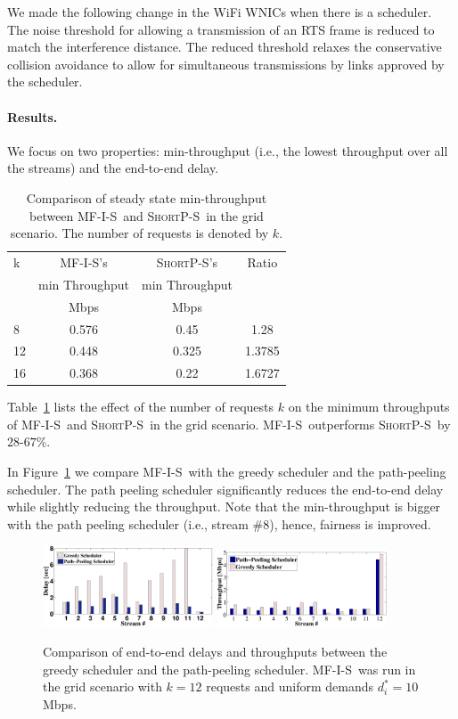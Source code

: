 \documentclass[12pt]{article}
\newenvironment{proof sketch}[1]{\noindent {\emph{Proof sketch of #1:}}}{\hfill \qed}
\newcommand{\algA}{\textsc{MF-I-S}}
\newcommand{\algBS}{\textsc{ShortP-S}}
\begin{document}
We made the following change in the WiFi WNICs when there is a
scheduler. The noise threshold for allowing a transmission of an RTS
frame is reduced to match the interference distance. The reduced
threshold relaxes the conservative collision avoidance to allow for
simultaneous transmissions by links approved by the scheduler.
\paragraph{Results.}
We focus on two properties: min-throughput (i.e., the lowest throughput
over all the streams) and the end-to-end delay.
\begin{table}
\centering \scriptsize
\begin{tabular}{|| l || c | c | c ||}
\hline 
k & \algA 's            & \algBS 's & Ratio\\
    &  min Throughput   & min Throughput & \\
\hline
& Mbps & Mbps & \\
\hline\hline 
8 & 0.576 & 0.45  & 1.28  \\
12 & 0.448 & 0.325 & 1.3785 \\
16 & 0.368  & 0.22 & 1.6727 \\
\hline
\end{tabular}
\caption{Comparison of steady state min-throughput between \algA\ and \algBS\ in the
  grid scenario.  The number of requests is denoted by $k$. }
\label{tab:minthroughput}
\end{table}

Table~\ref{tab:minthroughput} lists the effect of the number of
requests $k$  on the minimum throughputs of \algA\ and \algBS\ in the
grid scenario.  \algA\ outperforms \algBS\ by $28$-$67\%$.

In Figure~\ref{fig:sched} we compare \algA\ with the greedy scheduler
and the path-peeling scheduler.  The path peeling scheduler
significantly reduces the end-to-end delay while slightly reducing the
throughput. Note that the min-throughput is bigger with the
path peeling scheduler (i.e., stream \#8), hence, fairness is
improved.

\begin{figure}
\centering
\includegraphics[width=0.45\textwidth]{max_delay_greedy_vs_smart.eps}
\includegraphics[width=0.45\textwidth]{tp_sched_comparison.eps}
\caption{Comparison of end-to-end delays and throughputs between the greedy scheduler
  and the path-peeling scheduler.  \algA\ was run in the grid
scenario with $k=12$ requests and uniform demands $d^*_i=10$Mbps. }
  \label{fig:sched}
\end{figure}
\end{document}
